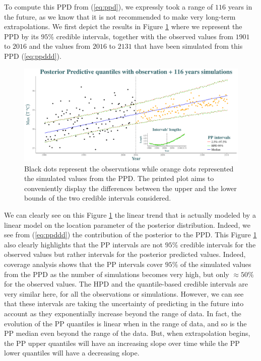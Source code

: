 To compute this PPD from (\ref{eq:ppd}), we expressly took a range of $116$ years in the future, as we know that it is not recommended to make very long-term extrapolations. We first depict the results in Figure \ref{fig:ppd} where we represent the PPD by its $95\%$ credible intervals, together with the observed values from $1901$ to $2016$ and the values from $2016$ to $2131$ that have been simulated from this PPD (\ref{eq:ppddd}).

 \begin{figure}[!htb]
 	\centering	\includegraphics[width=0.9\linewidth]{ppd.pdf}\caption{Black dots represent the observations while orange dots represented the simulated values from the PPD. The printed plot aims to conveniently display the differences between the upper and the lower bounds of the two credible intervals considered.}\label{fig:ppd}
 \end{figure}
 
 We can clearly see on this Figure \ref{fig:ppd} the linear trend that is actually modeled by a linear model on the location parameter of the posterior distribution.  Indeed, we see from (\ref{eq:ppddd}) the contribution of the posterior to the PPD. 
 This Figure \ref{fig:ppd} also clearly highlights that the PP intervals are not $95\%$ credible intervals for the observed values but rather intervals for the posterior predicted values. Indeed, coverage analysis shows that the PP intervals cover $95\%$ of the simulated values from the PPD as the number of simulations becomes very high, but only $\approx 50\%$ for the observed values. The HPD and the quantile-based credible intervals are very similar here, for all the observations or simulations. 
  However, we can see that these intervals are taking the uncertainty of predicting in the future into account as they exponentially increase beyond the range of data. 
 In fact, the evolution of the PP quantiles is linear when in the range of data, and so is the PP median even beyond the range of the data. But, when extrapolation begins, the PP upper quantiles will have an increasing slope over time while the PP lower quantiles will have a decreasing slope.
 
